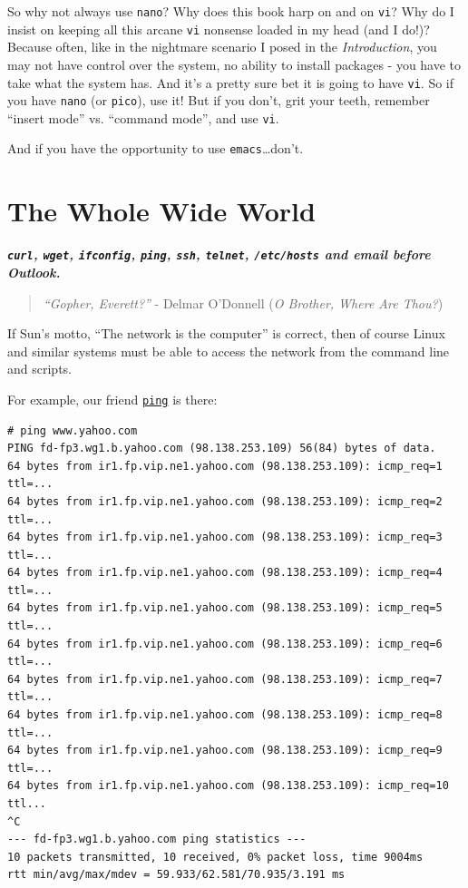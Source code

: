 \documentclass[10pt,]{book}
\numberwithin{figure}{chapter}
\begin{document}
So why not always use \texttt{nano}? Why does this book harp on and on
\texttt{vi}? Why do I insist on keeping all this arcane \texttt{vi}
nonsense loaded in my head (and I do!)? Because often, like in the
nightmare scenario I posed in the \emph{Introduction}, you may not have
control over the system, no ability to install packages - you have to
take what the system has. And it's a pretty sure bet it is going to have
\texttt{vi}. So if you have \texttt{nano} (or \texttt{pico}), use it!
But if you don't, grit your teeth, remember ``insert mode'' vs.
``command mode'', and use \texttt{vi}.

And if you have the opportunity to use \texttt{emacs}\ldots{}don't.

\chapter{The Whole Wide World}\label{the-whole-wide-world}

\textbf{\emph{\texttt{curl}, \texttt{wget}, \texttt{ifconfig},
\texttt{ping}, \texttt{ssh}, \texttt{telnet}, \texttt{/etc/hosts} and
email before Outlook.}}

\begin{quote}
\emph{``Gopher, Everett?''} - Delmar O'Donnell (\emph{O Brother, Where
Are Thou?})
\end{quote}

If Sun's motto, ``The network is the computer'' is correct, then of
course Linux and similar systems must be able to access the network from
the command line and scripts.

For example, our friend
\href{http://linux.die.net/man/8/ping}{\texttt{ping}} is there:

\begin{verbatim}
# ping www.yahoo.com
PING fd-fp3.wg1.b.yahoo.com (98.138.253.109) 56(84) bytes of data.
64 bytes from ir1.fp.vip.ne1.yahoo.com (98.138.253.109): icmp_req=1 ttl=...
64 bytes from ir1.fp.vip.ne1.yahoo.com (98.138.253.109): icmp_req=2 ttl=...
64 bytes from ir1.fp.vip.ne1.yahoo.com (98.138.253.109): icmp_req=3 ttl=...
64 bytes from ir1.fp.vip.ne1.yahoo.com (98.138.253.109): icmp_req=4 ttl=...
64 bytes from ir1.fp.vip.ne1.yahoo.com (98.138.253.109): icmp_req=5 ttl=...
64 bytes from ir1.fp.vip.ne1.yahoo.com (98.138.253.109): icmp_req=6 ttl=...
64 bytes from ir1.fp.vip.ne1.yahoo.com (98.138.253.109): icmp_req=7 ttl=...
64 bytes from ir1.fp.vip.ne1.yahoo.com (98.138.253.109): icmp_req=8 ttl=...
64 bytes from ir1.fp.vip.ne1.yahoo.com (98.138.253.109): icmp_req=9 ttl=...
64 bytes from ir1.fp.vip.ne1.yahoo.com (98.138.253.109): icmp_req=10 ttl...
^C
--- fd-fp3.wg1.b.yahoo.com ping statistics ---
10 packets transmitted, 10 received, 0% packet loss, time 9004ms
rtt min/avg/max/mdev = 59.933/62.581/70.935/3.191 ms
\end{verbatim}
\end{document}
